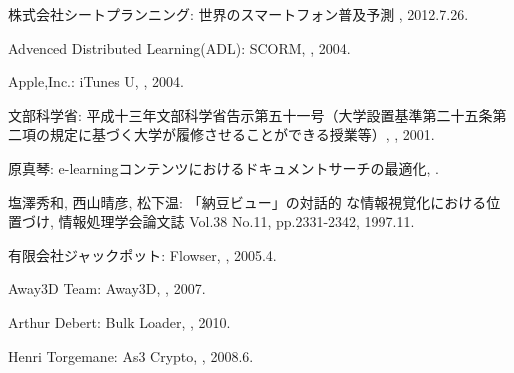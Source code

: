 \begin{bib}[100]




\begin{flushleft}
  株式会社シートプランニング:
  \newblock 世界のスマートフォン普及予測
  , 2012.7.26.
\end{flushleft}

\begin{flushleft}
  Advenced Distributed Learning(ADL):
  \newblock SCORM,
  , 2004.
\end{flushleft}
  
\begin{flushleft}
  Apple,Inc.:
  \newblock iTunes U,
  , 2004. 
\end{flushleft}

\begin{flushleft}
  文部科学省:
  \newblock 平成十三年文部科学省告示第五十一号（大学設置基準第二十五条第二項の規定に基づく大学が履修させることができる授業等）,
  , 2001.
\end{flushleft}

\begin{flushleft}
  原真琴:
  \newblock e-learningコンテンツにおけるドキュメントサーチの最適化,
  .
\end{flushleft}

\begin{flushleft}
  塩澤秀和, 西山晴彦, 松下温:
  \newblock 「納豆ビュー」の対話的 な情報視覚化における位置づけ,
  \newblock 情報処理学会論文誌 Vol.38 No.11, pp.2331-2342, 1997.11.
\end{flushleft}

\begin{flushleft}
  有限会社ジャックポット:
  \newblock Flowser,
  , 2005.4.
\end{flushleft}

\begin{flushleft}
  Away3D Team:
  \newblock Away3D,
  , 2007.
\end{flushleft}

\begin{flushleft}
  Arthur Debert:
  \newblock Bulk Loader,
  , 2010.
\end{flushleft}

\begin{flushleft}
  Henri Torgemane:
  \newblock As3 Crypto,
  , 2008.6.
\end{flushleft}

\end{bib}